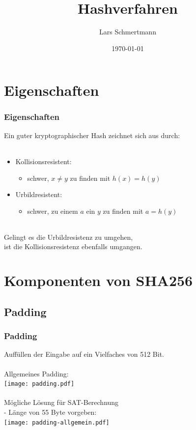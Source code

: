 \documentclass{beamer}
\title{Hashverfahren}
\author{Lars Schmertmann}
\date{\today}
\begin{document}
\maketitle
\frame{\tableofcontents[currentsection]}

\section{Eigenschaften}
  \begin{frame}
    \frametitle{Eigenschaften}
    Ein guter kryptographischer Hash zeichnet sich aus durch:\\
    ~\\
    \begin{itemize}
      \setlength{\itemsep}{20pt}
      \item Kollisionsresistent:
      \begin{itemize}
        \item schwer, $ x \neq y $ zu finden mit $ h(x) = h(y) $
      \end{itemize}
      \item Urbildresistent:
      \begin{itemize}
        \item schwer, zu einem $ a $ ein $ y $ zu finden mit $ a = h(y) $
      \end{itemize}
    \end{itemize}
    ~\\
    Gelingt es die Urbildresistenz zu umgehen,\\
    ist die Kollisionsresistenz ebenfalls umgangen.
  \end{frame}

\section{Komponenten von SHA256}
\subsection{Padding}
  \begin{frame}
    \frametitle{Padding}
    Auffüllen der Eingabe auf ein Vielfaches von 512 Bit.\\
    ~\\
    Allgemeines Padding:\\
    \texttt{[image: padding.pdf]}\\
    \pause~\\
    Mögliche Lösung für SAT-Berechnung\\
    - Länge von 55 Byte vorgeben:\\
    \texttt{[image: padding-allgemein.pdf]}
  \end{frame}
\end{document}
